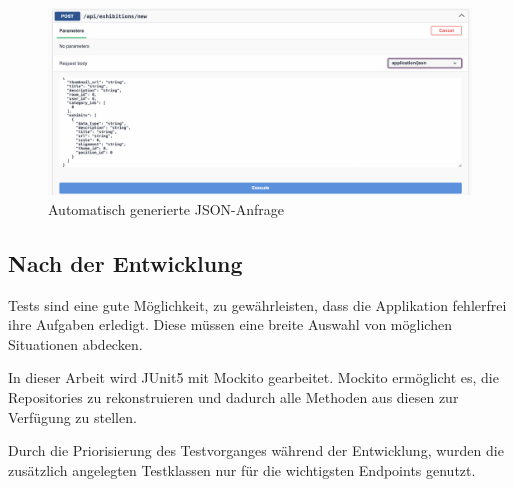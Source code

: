 \begin{figure}
    \centering
    \includegraphics[scale=0.3]{pics/swaggeruipost.png}
    \caption{Automatisch generierte JSON-Anfrage}
    \label{fig:implementation:swaggeruipost}
\end{figure}

\subsection{Nach der Entwicklung}
Tests sind eine gute Möglichkeit, zu gewährleisten, dass die Applikation fehlerfrei ihre Aufgaben erledigt. 
Diese müssen eine breite Auswahl von möglichen Situationen abdecken.

In dieser Arbeit wird JUnit5 mit Mockito gearbeitet.
Mockito ermöglicht es, die Repositories zu rekonstruieren und dadurch alle Methoden aus diesen zur Verfügung zu stellen.

Durch die Priorisierung des Testvorganges während der Entwicklung, wurden die zusätzlich angelegten Testklassen nur für die wichtigsten Endpoints genutzt.

